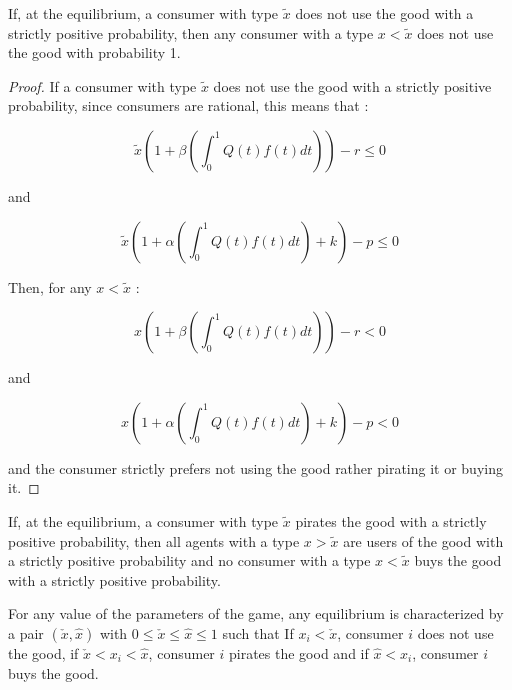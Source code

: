 \begin{result}
If, at the equilibrium, a consumer with type $\tilde{x}$ does not use the good with a strictly positive probability, then any consumer with a type $x<\tilde{x}$ does not use the good with probability 1. 
\end{result}

\begin{proof}

If a consumer with type $\tilde{x}$ does not use the good with a strictly positive probability, since consumers are rational, this means that : 

\begin{equation}
\tilde{x}(1+\beta (\int^{1}_{0}Q(t)f(t)dt))-r \leq 0
\end{equation}

and

\begin{equation}
\tilde{x}(1+\alpha (\int^{1}_{0}Q(t)f(t)dt)+k)-p \leq  0 
\end{equation}


Then, for any $x<\tilde{x}$ :

\begin{equation}
x(1+\beta (\int^{1}_{0}Q(t)f(t)dt))-r < 0
\end{equation}

and

\begin{equation}
x(1+\alpha (\int^{1}_{0}Q(t)f(t)dt)+k)-p <  0 
\end{equation}

and the consumer strictly prefers not using the good rather pirating it or buying it.


\end{proof}

\begin{corollary}
If, at the equilibrium, a consumer with type $\tilde{x}$ pirates the good with a strictly positive probability, then all agents with a type $x>\tilde{x}$ are users of the good with a strictly positive probability and no consumer  with a type $x<\tilde{x}$ buys the good with a strictly positive probability.
\end{corollary}

\begin{corollary}
For any value of the parameters of the game, any equilibrium is characterized by a pair $(\check{x},\hat{x})$ with $0\leq \check{x} \leq \hat{x} \leq 1$ such that If $x_i<\check{x}$, consumer $i$ does not use the good, if $\check{x} <x_i <\hat{x}$, consumer $i$ pirates the good and if $\hat{x}<x_i$, consumer $i$ buys the good. 
\end{corollary}

